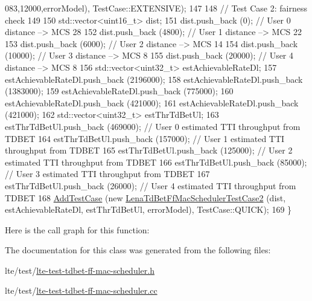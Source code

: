 \begin{DoxyCode}
      083,12000,errorModel), TestCase::EXTENSIVE);
147 
148   \textcolor{comment}{// Test Case 2: fairness check}
149 
150   std::vector<uint16\_t> dist;
151   dist.push\_back (0);       \textcolor{comment}{// User 0 distance --> MCS 28}
152   dist.push\_back (4800);    \textcolor{comment}{// User 1 distance --> MCS 22}
153   dist.push\_back (6000);    \textcolor{comment}{// User 2 distance --> MCS 14}
154   dist.push\_back (10000);    \textcolor{comment}{// User 3 distance --> MCS 8}
155   dist.push\_back (20000);    \textcolor{comment}{// User 4 distance --> MCS 8}
156   std::vector<uint32\_t> estAchievableRateDl;
157   estAchievableRateDl.push\_back (2196000);
158   estAchievableRateDl.push\_back (1383000);
159   estAchievableRateDl.push\_back (775000);
160   estAchievableRateDl.push\_back (421000);
161   estAchievableRateDl.push\_back (421000);
162   std::vector<uint32\_t> estThrTdBetUl;
163   estThrTdBetUl.push\_back (469000); \textcolor{comment}{// User 0 estimated TTI throughput from TDBET}
164   estThrTdBetUl.push\_back (157000); \textcolor{comment}{// User 1 estimated TTI throughput from TDBET}
165   estThrTdBetUl.push\_back (125000); \textcolor{comment}{// User 2 estimated TTI throughput from TDBET}
166   estThrTdBetUl.push\_back (85000);  \textcolor{comment}{// User 3 estimated TTI throughput from TDBET}
167   estThrTdBetUl.push\_back (26000);  \textcolor{comment}{// User 4 estimated TTI throughput from TDBET}
168   \hyperlink{classns3_1_1TestCase_a3718088e3eefd5d6454569d2e0ddd835}{AddTestCase} (\textcolor{keyword}{new} \hyperlink{classLenaTdBetFfMacSchedulerTestCase2}{LenaTdBetFfMacSchedulerTestCase2} (dist, 
      estAchievableRateDl, estThrTdBetUl, errorModel), TestCase::QUICK);
169 \}
\end{DoxyCode}


Here is the call graph for this function\+:




The documentation for this class was generated from the following files\+:\begin{DoxyCompactItemize}
\item 
lte/test/\hyperlink{lte-test-tdbet-ff-mac-scheduler_8h}{lte-\/test-\/tdbet-\/ff-\/mac-\/scheduler.\+h}\item 
lte/test/\hyperlink{lte-test-tdbet-ff-mac-scheduler_8cc}{lte-\/test-\/tdbet-\/ff-\/mac-\/scheduler.\+cc}\end{DoxyCompactItemize}
